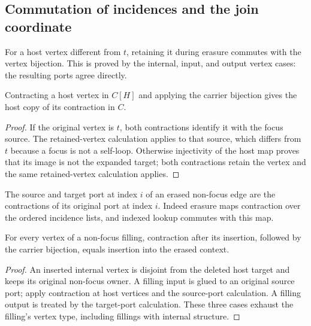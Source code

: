 \subsection{Commutation of incidences and the join coordinate}
For a host vertex different from $t$, retaining it during erasure commutes with
the vertex bijection. This is proved by the internal, input, and output vertex
cases: the resulting ports agree directly.
\begin{lemma}
Contracting a host vertex in $C[H]$ and applying the carrier bijection gives the
host copy of its contraction in $C$.
\end{lemma}
\begin{proof}
If the original vertex is $t$, both contractions identify it with the focus
source. The retained-vertex calculation applies to that source, which differs
from $t$ because a focus is not a self-loop. Otherwise injectivity of the host
map proves that its image is not the expanded target; both contractions retain
the vertex and the same retained-vertex calculation applies.
\end{proof}
The source and target port at index $i$ of an erased non-focus edge are the
contractions of its original port at index $i$. Indeed erasure maps contraction
over the ordered incidence lists, and indexed lookup commutes with this map.
\begin{lemma}
For every vertex of a non-focus filling, contraction after its insertion,
followed by the carrier bijection, equals insertion into the erased context.
\end{lemma}
\begin{proof}
An inserted internal vertex is disjoint from the deleted host target and keeps
its original non-focus owner. A filling input is glued to an original source
port; apply contraction at host vertices and the source-port calculation.
A filling output is treated by the target-port calculation. These three cases
exhaust the filling's vertex type, including fillings with internal structure.
\end{proof}

